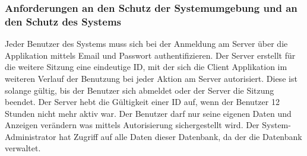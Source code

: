 \documentclass[a4paper,12pt,oneside]{scrartcl}
\begin{document}
\subsubsection{Anforderungen an den Schutz der Systemumgebung und an den Schutz des Systems}
Jeder Benutzer des Systems muss sich bei der Anmeldung am Server über die Applikation mittels Email und Passwort authentifizieren.
Der Server erstellt für die weitere Sitzung eine eindeutige ID, mit der sich die Client Applikation im weiteren Verlauf der Benutzung bei jeder Aktion am Server autorisiert.
Diese ist solange gültig, bis der Benutzer sich abmeldet oder der Server die Sitzung beendet.
Der Server hebt die Gültigkeit einer ID auf, wenn der Benutzer 12 Stunden nicht mehr aktiv war.
Der Benutzer darf nur seine eigenen Daten und Anzeigen verändern was mittels Autorisierung sichergestellt wird.
Der System-Administrator hat Zugriff auf alle Daten dieser Datenbank, da der die Datenbank verwaltet. 
\end{document}
